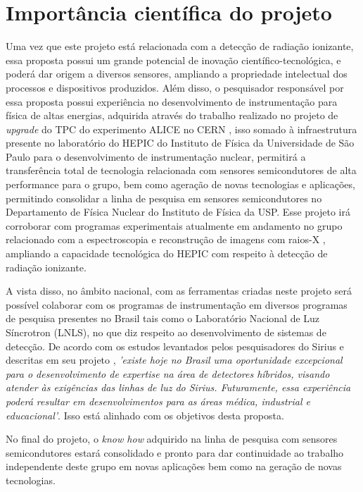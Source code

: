 \chapter{Importância científica do projeto}

\thispagestyle{plain}
Uma vez que este projeto está relacionada com a detecção de radiação ionizante, essa proposta possui um grande potencial de inovação científico-tecnológica, e poderá dar origem a diversos sensores, ampliando a propriedade intelectual dos processos e dispositivos produzidos. Além disso, o pesquisador responsável por essa proposta possui experiência no desenvolvimento de instrumentação para física de altas energias, adquirida através do trabalho realizado no projeto de {\it upgrade} do TPC do experimento ALICE no CERN \cite{tpcNIM,discharge_paper,GSI_REPO,THGEM}, isso somado à infraestrutura presente no laboratório do HEPIC do Instituto de Física da Universidade de São Paulo para o desenvolvimento de instrumentação nuclear, permitirá a transferência total de tecnologia relacionada com sensores semicondutores de alta performance para o grupo, bem como ageração de novas tecnologias e aplicações, permitindo consolidar a linha de pesquisa em sensores semicondutores no Departamento de Física Nuclear do Instituto de Física da USP. Esse projeto irá corroborar com programas experimentais atualmente em andamento no grupo relacionado com a espectroscopia e reconstrução de imagens com raios-X \cite{THGEM,NIM,xray}, ampliando a capacidade tecnológica do HEPIC com respeito à detecção de radiação ionizante. 
\thispagestyle{plain}

A vista disso, no âmbito nacional, com as ferramentas criadas neste projeto será possível colaborar com os programas de instrumentação em diversos programas de pesquisa presentes no Brasil tais como o Laboratório Nacional de Luz Síncrotron (LNLS), no que diz respeito ao desenvolvimento de sistemas de detecção. De acordo com os estudos levantados pelos pesquisadores do Sirius e descritas em seu projeto \cite{sirius}, {\it 'existe hoje no Brasil uma oportunidade excepcional para o desenvolvimento de expertise na área de detectores híbridos, visando atender às exigências das linhas de luz do Sirius. Futuramente, essa experiência poderá resultar em desenvolvimentos para as áreas médica, industrial e educacional'}. Isso está alinhado com os objetivos desta proposta.

\thispagestyle{plain}
No final do projeto, o {\it know how} adquirido na linha de pesquisa com sensores semicondutores estará consolidado e pronto para dar continuidade ao trabalho independente deste grupo em novas aplicações bem como na geração de novas tecnologias.

\renewcommand{\cleardoublepage}{}
\renewcommand{\clearpage}{}
